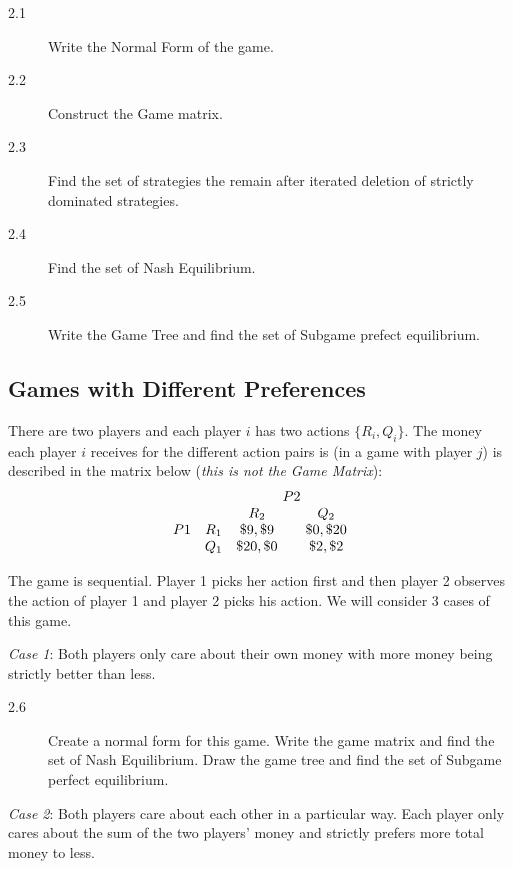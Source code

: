 \documentclass[11pt]{article}
\begin{document}
\vspace{1.5em}
\begin{description}
\item[2.1] Write the Normal Form of the game.
\item[2.2] Construct the Game matrix.
\end{description}

\newpage
\begin{description}
\item[2.3] Find the set of strategies the remain after iterated deletion of strictly dominated strategies.
\item[2.4] Find the set of Nash Equilibrium.
\item[2.5] Write the Game Tree and find the set of Subgame prefect equilibrium.
\end{description}

\subsection{Games with Different Preferences}

\noindent There are two players and each player $i$ has two actions $\{R_i,Q_i\}$. The money each player $i$ receives for the different action pairs is (in a game with player $j$) is described in the matrix below (\emph{this is not the Game Matrix}):
\[
\begin{array}{ccc@{\qquad}c}
 & & \multicolumn{2}{c}{P2}\\
 & & R_2 & Q_2\\
P1 & R_1 & \$9,\$9 & \$0,\$20\\
 & Q_1 & \$20,\$0 & \$2,\$2
\end{array}
\]

The game is sequential. Player 1 picks her action first and then player 2 observes the action of player 1 and player 2 picks his action. We will consider 3 cases of this game.

\emph{Case 1}: Both players only care about their own money with more money being strictly better than less.

\begin{description}
\item[2.6] Create a normal form for this game. Write the game matrix and find the set of Nash Equilibrium. Draw the game tree and find the set of Subgame perfect equilibrium.
\end{description}

\emph{Case 2}: Both players care about each other in a particular way. Each player only cares about the sum of the two players' money and strictly prefers more total money to less.
\end{document}
